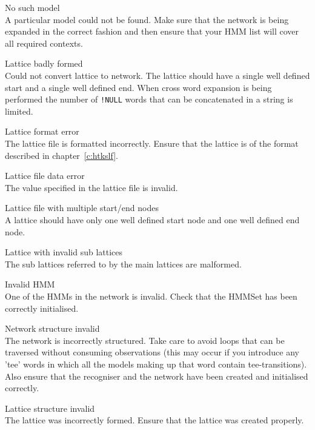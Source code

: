 \begin{itemize}
\begin{itemize}
    No such model\\
        A particular model could not be found.  Make sure that the network is
        being expanded in the correct fashion and then ensure that your HMM
        list will cover all required contexts.

    Lattice badly formed\\
        Could not convert lattice to network.  The lattice should have a single
        well defined start and a single well defined end.  When cross word 
        expansion is being performed the number of \texttt{!NULL} words that 
        can be concatenated in a string is limited.

    Lattice format error\\
        The lattice file is formatted incorrectly.  Ensure that the lattice
        is of the format described in chapter~\ref{c:htkslf}.

    Lattice file data error\\
        The value specified in the lattice file is invalid.

    Lattice file with multiple start/end nodes\\
        A lattice should have only one well defined start node and one
        well defined end node.

    Lattice with invalid sub lattices\\
        The sub lattices referred to by the main lattices are
        malformed.

\end{itemize}



\begin{itemize}
 Invalid HMM\\
        One of the HMMs in the network is invalid.  Check that the HMMSet
        has been correctly initialised.

    Network structure invalid\\
        The network is incorrectly structured.  Take care to avoid loops
        that can be traversed without consuming observations (this may occur 
        if you introduce any 'tee' words in which all the models making up that
        word contain tee-transitions).  Also ensure that the recogniser and
        the network have been created and initialised correctly.

    Lattice structure invalid\\
        The lattice was incorrectly formed.  Ensure that the lattice was
        created properly.


\end{itemize}
\end{itemize}
